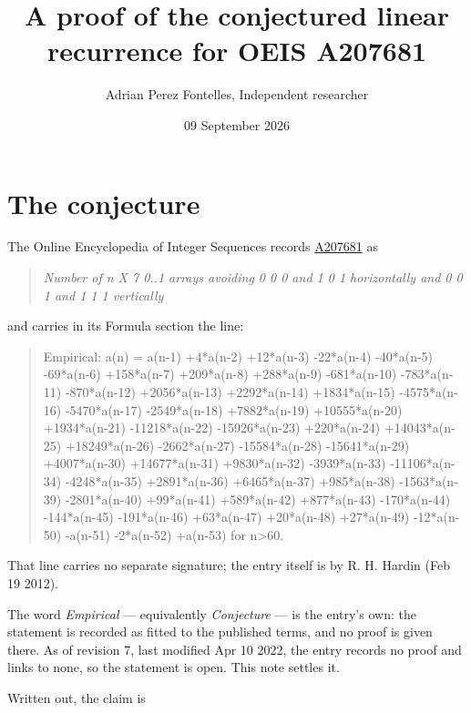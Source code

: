 \documentclass[11pt]{article}
\title{A proof of the conjectured linear recurrence for OEIS A207681}
\author{Adrian Perez Fontelles, Independent researcher}
\date{09 September 2026}
\theoremstyle{definition}
\begin{document}
\maketitle
\section{The conjecture}

The Online Encyclopedia of Integer Sequences records \href{https://oeis.org/A207681}{A207681} as

\begin{quote}\itshape Number of n X 7 0..1 arrays avoiding 0 0 0 and 1 0 1 horizontally and 0 0 1 and 1 1 1 vertically\end{quote}

and carries in its Formula section the line:

\begin{quote}\ttfamily Empirical: a(n) = a(n-1) +4*a(n-2) +12*a(n-3) -22*a(n-4) -40*a(n-5) -69*a(n-6) +158*a(n-7) +209*a(n-8) +288*a(n-9) -681*a(n-10) -783*a(n-11) -870*a(n-12) +2056*a(n-13) +2292*a(n-14) +1834*a(n-15) -4575*a(n-16) -5470*a(n-17) -2549*a(n-18) +7882*a(n-19) +10555*a(n-20) +1934*a(n-21) -11218*a(n-22) -15926*a(n-23) +220*a(n-24) +14043*a(n-25) +18249*a(n-26) -2662*a(n-27) -15584*a(n-28) -15641*a(n-29) +4007*a(n-30) +14677*a(n-31) +9830*a(n-32) -3939*a(n-33) -11106*a(n-34) -4248*a(n-35) +2891*a(n-36) +6465*a(n-37) +985*a(n-38) -1563*a(n-39) -2801*a(n-40) +99*a(n-41) +589*a(n-42) +877*a(n-43) -170*a(n-44) -144*a(n-45) -191*a(n-46) +63*a(n-47) +20*a(n-48) +27*a(n-49) -12*a(n-50) -a(n-51) -2*a(n-52) +a(n-53) for n>60.\end{quote}

That line carries no separate signature; the entry itself is by R. H. Hardin (Feb 19 2012).

The word {\itshape Empirical} --- equivalently {\itshape Conjecture} --- is the entry's own: the statement is recorded as fitted to the published terms, and no proof is given there. As of revision 7, last modified Apr 10 2022, the entry records no proof and links to none, so the statement is open. This note settles it.

Written out, the claim is
\end{document}
